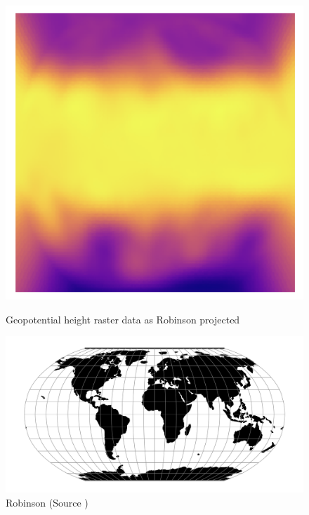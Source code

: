\begin{figure}[H]
    \centering
    \begin{minipage}{0.30\textwidth}
        \centering
        \includegraphics[width=0.9\linewidth]{figures/chapter-8/geopoth_robin.png}
        \caption{ Geopotential height raster data as Robinson projected}
        \label{fig:robin_geopoth_raster}
    \end{minipage}\hfill
    \begin{minipage}{0.30\textwidth}
        \centering
        \includegraphics[width=0.9\linewidth]{figures/chapter-8/robin.png}
        \caption{Robinson (Source \cite{PROJ_SITE})}
        \label{fig:robin_proj}
    \end{minipage}\hfill
    \begin{minipage}{0.30\textwidth}
        \centering

\end{minipage}
\end{figure}
